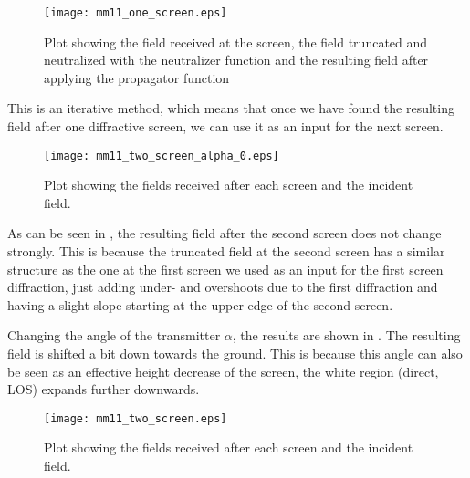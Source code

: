 \begin{figure}[!h]
  \centering
  \texttt{[image: mm11\_one\_screen.eps]}
  \caption{Plot showing the field received at the screen, the field truncated and neutralized with the neutralizer function and the resulting field after applying the propagator function}
  \label{fig:mm11_one_screen}
\end{figure}

This is an iterative method, which means that once we have found the resulting field after one diffractive screen, we can use it as an input for the next screen. 

\begin{figure}[!h]
  \centering
  \texttt{[image: mm11\_two\_screen\_alpha\_0.eps]}
  \caption{Plot showing the fields received after each screen and the incident field.}
  \label{fig:mm11_two_screen_alpha_0}
\end{figure}

As can be seen in , the resulting field after the second screen does not change strongly. This is because the truncated field at the second screen has a similar structure as the one at the first screen we used as an input for the first screen diffraction, just adding under- and overshoots due to the first diffraction and having a slight slope starting at the upper edge of the second screen. 

Changing the angle of the transmitter $\alpha$, the results are shown in . The resulting field is shifted a bit down towards the ground. This is because this angle can also be seen as an effective height decrease of the screen, the white region (direct, LOS) expands further downwards.

\begin{figure}[!h]
  \centering
  \texttt{[image: mm11\_two\_screen.eps]}
  \caption{Plot showing the fields received after each screen and the incident field.}
  \label{fig:mm11_two_screen}
\end{figure}


